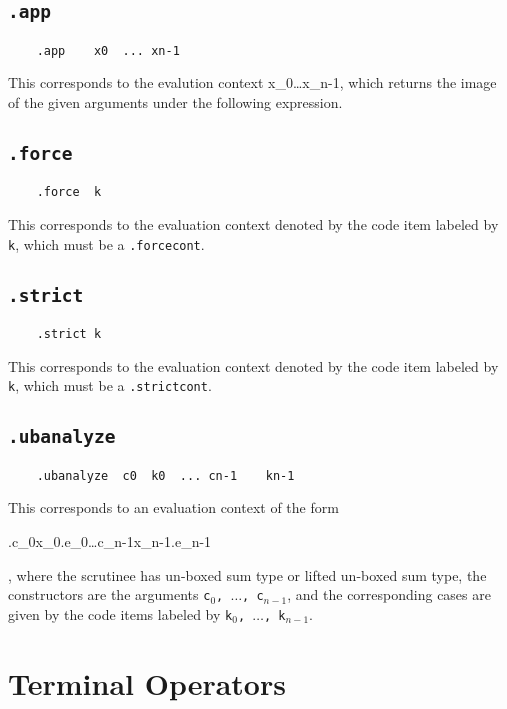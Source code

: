 \documentclass{report}
\newcommand\stringcode[1]{\texttt{#1}}
\begin{document}
\subsection{\stringcode{.app}}

\begin{verbatim}
	.app	x0	...	xn-1
\end{verbatim}
This corresponds to the evalution context \<\bullet\;x_0\;\ldots\;x_n{-1}\>,
which returns the image of the given arguments under the following expression.

\subsection{\stringcode{.force}}

\begin{verbatim}
	.force	k
\end{verbatim}
This corresponds to the evaluation context denoted by the code item labeled by \stringcode{k},
which must be a \stringcode{.forcecont}.

\subsection{\stringcode{.strict}}

\begin{verbatim}
	.strict	k
\end{verbatim}
This corresponds to the evaluation context denoted by the code item labeled by \stringcode{k},
which must be a \stringcode{.strictcont}.

\subsection{\stringcode{.ubanalyze}}

\begin{verbatim}
	.ubanalyze	c0	k0	...	cn-1	kn-1
\end{verbatim}
This corresponds to an evaluation context of the form
\begin{haskell}
\;\bullet.\;\;c_0\;x_0.\;e_0\ldots{}\;c_{n-1}\;x_{n-1}.\;e_{n-1}
\end{haskell},
where the scrutinee has un-boxed sum type or lifted un-boxed sum type,
the constructors are the arguments \stringcode{c$_0$, $\ldots$, c$_{n-1}$},
and the corresponding cases are given by the code items labeled by \stringcode{k$_0$, $\ldots$, k$_{n-1}$}.

\section{Terminal Operators}
\label{terminal_op}
\end{document}

